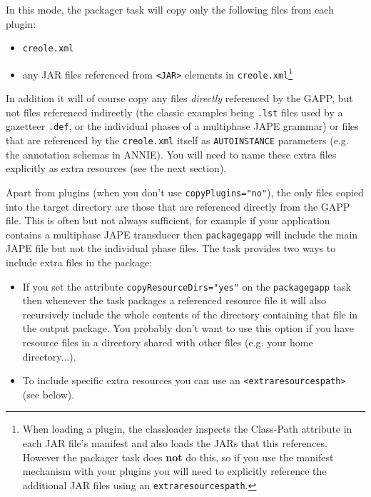 In this mode, the packager task will copy only the following files from each
plugin:

\begin{itemize}
\item \texttt{creole.xml}
\item any JAR files referenced from \verb|<JAR>| elements in
\texttt{creole.xml}\footnote{When loading a plugin, the classloader inspects
  the Class-Path attribute in each JAR file's manifest and also loads the JARs
  that this references.  However the packager task does {\bf not} do this, so
  if you use the manifest mechanism with your plugins you will need to
  explicitly reference the additional JAR files using an
  \texttt{extraresourcespath}.}
\end{itemize}

In addition it will of course copy any files \emph{directly} referenced by the
GAPP, but not files referenced indirectly (the classic examples being
\texttt{.lst} files used by a gazetteer \texttt{.def}, or the individual phases
of a multiphase JAPE grammar) or files that are referenced by the
\texttt{creole.xml} itself as \texttt{AUTOINSTANCE} parameters (e.g. the
annotation schemas in ANNIE).  You will need to name these extra files
explicitly as extra resources (see the next section).


Apart from plugins (when you don't use \verb|copyPlugins="no"|), the only files
copied into the target directory are those that are referenced directly from
the GAPP file.  This is often but not always sufficient, for example if your
application contains a multiphase JAPE transducer then \texttt{packagegapp} will
include the main JAPE file but not the individual phase files.  The task provides two ways to include extra files in the package:

\begin{itemize}
\item If you set the attribute \verb|copyResourceDirs="yes"| on the
  \texttt{packagegapp} task then whenever the task packages a referenced
  resource file it will also recursively include the whole contents of the
  directory containing that file in the output package.  You probably don't
  want to use this option if you have resource files in a directory shared with
  other files (e.g. your home directory...).
\item To include specific extra resources you can use an
  \verb|<extraresourcespath>| (see below).
\end{itemize}

